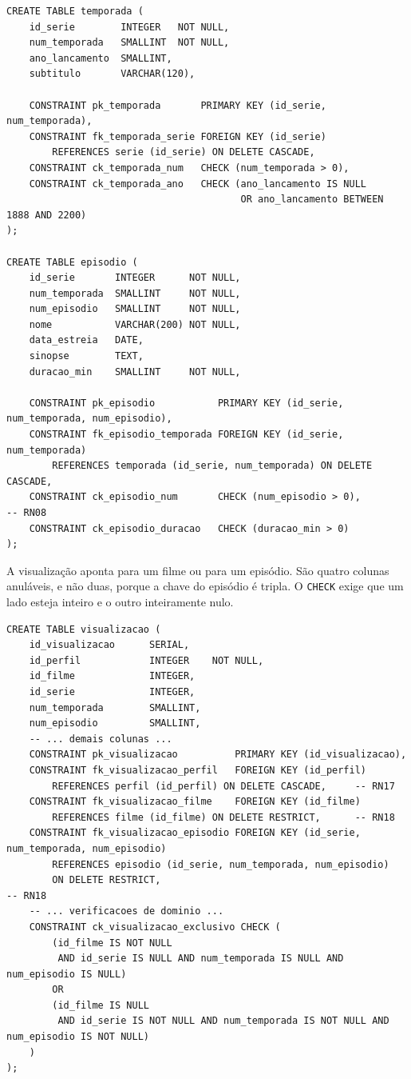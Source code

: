 \documentclass[a4paper,12pt,oneside,openany]{book}
\newcommand{\bd}[1]{\texttt{#1}}
\begin{document}
\begin{lstlisting}[caption={Entidades fracas e suas chaves primárias compostas.},label={lst:fraca},basicstyle=\ttfamily\scriptsize]
CREATE TABLE temporada (
    id_serie        INTEGER   NOT NULL,
    num_temporada   SMALLINT  NOT NULL,
    ano_lancamento  SMALLINT,
    subtitulo       VARCHAR(120),

    CONSTRAINT pk_temporada       PRIMARY KEY (id_serie, num_temporada),
    CONSTRAINT fk_temporada_serie FOREIGN KEY (id_serie)
        REFERENCES serie (id_serie) ON DELETE CASCADE,
    CONSTRAINT ck_temporada_num   CHECK (num_temporada > 0),
    CONSTRAINT ck_temporada_ano   CHECK (ano_lancamento IS NULL
                                         OR ano_lancamento BETWEEN 1888 AND 2200)
);

CREATE TABLE episodio (
    id_serie       INTEGER      NOT NULL,
    num_temporada  SMALLINT     NOT NULL,
    num_episodio   SMALLINT     NOT NULL,
    nome           VARCHAR(200) NOT NULL,
    data_estreia   DATE,
    sinopse        TEXT,
    duracao_min    SMALLINT     NOT NULL,

    CONSTRAINT pk_episodio           PRIMARY KEY (id_serie, num_temporada, num_episodio),
    CONSTRAINT fk_episodio_temporada FOREIGN KEY (id_serie, num_temporada)
        REFERENCES temporada (id_serie, num_temporada) ON DELETE CASCADE,
    CONSTRAINT ck_episodio_num       CHECK (num_episodio > 0),        -- RN08
    CONSTRAINT ck_episodio_duracao   CHECK (duracao_min > 0)
);
\end{lstlisting}

A visualização aponta para um filme ou para um episódio. São quatro colunas
anuláveis, e não duas, porque a chave do episódio é tripla. O \bd{CHECK} exige
que um lado esteja inteiro e o outro inteiramente nulo.

\begin{lstlisting}[caption={Relacionamento exclusivo em \bd{visualizacao} (RN12).},label={lst:exclusivo},basicstyle=\ttfamily\scriptsize]
CREATE TABLE visualizacao (
    id_visualizacao      SERIAL,
    id_perfil            INTEGER    NOT NULL,
    id_filme             INTEGER,
    id_serie             INTEGER,
    num_temporada        SMALLINT,
    num_episodio         SMALLINT,
    -- ... demais colunas ...
    CONSTRAINT pk_visualizacao          PRIMARY KEY (id_visualizacao),
    CONSTRAINT fk_visualizacao_perfil   FOREIGN KEY (id_perfil)
        REFERENCES perfil (id_perfil) ON DELETE CASCADE,     -- RN17
    CONSTRAINT fk_visualizacao_filme    FOREIGN KEY (id_filme)
        REFERENCES filme (id_filme) ON DELETE RESTRICT,      -- RN18
    CONSTRAINT fk_visualizacao_episodio FOREIGN KEY (id_serie, num_temporada, num_episodio)
        REFERENCES episodio (id_serie, num_temporada, num_episodio)
        ON DELETE RESTRICT,                                            -- RN18
    -- ... verificacoes de dominio ...
    CONSTRAINT ck_visualizacao_exclusivo CHECK (
        (id_filme IS NOT NULL
         AND id_serie IS NULL AND num_temporada IS NULL AND num_episodio IS NULL)
        OR
        (id_filme IS NULL
         AND id_serie IS NOT NULL AND num_temporada IS NOT NULL AND num_episodio IS NOT NULL)
    )
);
\end{lstlisting}
\end{document}
